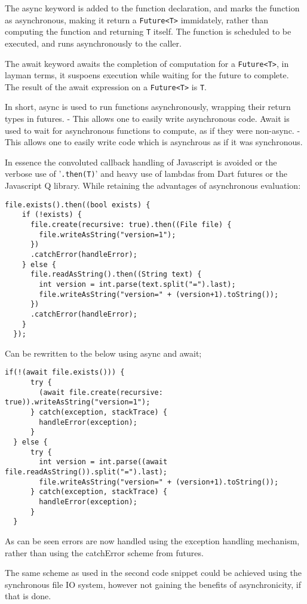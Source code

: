 The async keyword is added to the function declaration, and marks the
function as asynchronous, making it return a \verb|Future<T>|
immidately, rather than computing the function and returning \verb|T|
itself.  The function is scheduled to be executed, and runs
asynchronously to the caller.

The await keyword awaits the completion of computation for a
\verb|Future<T>|, in layman terms, it suspoens execution while waiting
for the future to complete.  The result of the await expression on a
\verb|Future<T>| is \verb|T|.

In short, async is used to run functions asynchronously, wrapping
their return types in futures. - This allows one to easily write
asynchronous code.  Await is used to wait for asynchronous functions
to compute, as if they were non-async. - This allows one to easily
write code which is asynchrous as if it was synchronous.

In essence the convoluted callback handling of Javascript is avoided
or the verbose use of '\verb|.then(T)|' and heavy use of lambdas from
Dart futures or the Javascript Q library. While retaining the
advantages of asynchronous evaluation:
\begin{verbatim}
file.exists().then((bool exists) {
    if (!exists) {
      file.create(recursive: true).then((File file) {
        file.writeAsString("version=1");
      })
      .catchError(handleError);
    } else {
      file.readAsString().then((String text) {
        int version = int.parse(text.split("=").last);
        file.writeAsString("version=" + (version+1).toString());
      })
      .catchError(handleError);
    }
  });
\end{verbatim}
Can be rewritten to the below using async and await;
\begin{verbatim}
if(!(await file.exists())) {
      try {
        (await file.create(recursive: true)).writeAsString("version=1");
      } catch(exception, stackTrace) {
        handleError(exception);
      }
  } else {
      try {
        int version = int.parse((await file.readAsString()).split("=").last);
        file.writeAsString("version=" + (version+1).toString());
      } catch(exception, stackTrace) {
        handleError(exception);
      }
  }
\end{verbatim}
As can be seen errors are now handled using the exception handling
mechanism, rather than using the catchError scheme from futures.

The same scheme as used in the second code snippet could be achieved
using the synchronous file IO system, however not gaining
the benefits of asynchronicity, if that is done.
